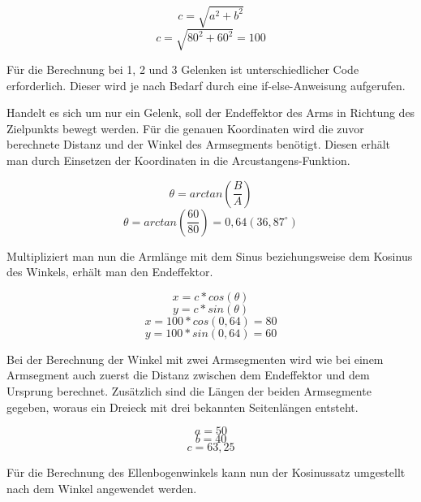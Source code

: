 \documentclass[12pt]{article}
\begin{document}
                \[
                    c = \sqrt{a^2 + b^2}
                \]
                \[
                    c = \sqrt{80^2 + 60^2} = 100
                \]


                Für die Berechnung bei 1, 2 und 3 Gelenken ist unterschiedlicher Code erforderlich. Dieser wird je
                nach Bedarf durch eine if-else-Anweisung aufgerufen.

                    Handelt es sich um nur ein Gelenk, soll der Endeffektor des Arms in Richtung des Zielpunkts
                    bewegt werden. Für die genauen Koordinaten wird die zuvor berechnete Distanz und der Winkel des
                    Armsegments benötigt. Diesen erhält man durch Einsetzen der Koordinaten in die
                    Arcustangens-Funktion.

                    \[
                        \theta=arctan(\frac{B}{A})
                    \]
                    \[
                        \theta=arctan(\frac{60}{80})=0,64 (36,87^\circ)
                    \]

                    Multipliziert man nun die Armlänge mit dem Sinus beziehungsweise dem Kosinus des Winkels, erhält
                    man den Endeffektor.

                    \[
                        x=c * cos(\theta)
                    \]
                    \[
                        y=c * sin(\theta)
                    \]
                    \[
                        x=100 * cos(0,64)=80
                    \]
                    \[
                        y=100 * sin(0,64)=60
                    \]


                    Bei der Berechnung der Winkel mit zwei Armsegmenten wird wie bei einem Armsegment auch zuerst
                    die Distanz zwischen dem Endeffektor und dem Ursprung berechnet. Zusätzlich sind die Längen der
                    beiden Armsegmente gegeben, woraus ein Dreieck mit drei bekannten Seitenlängen entsteht.

                    \[
                        a=50
                    \]
                    \[
                        b=40
                    \]
                    \[
                        c=63,25
                    \]

                    Für die Berechnung des Ellenbogenwinkels kann nun der Kosinussatz umgestellt nach dem Winkel
                    angewendet werden.
\end{document}

